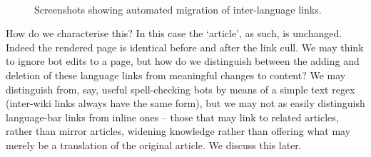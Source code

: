 \begin{figure}
  \label{fig:traj-bot-explanation}
  \centering
  \\
\caption{Screenshots showing automated migration of inter-language links.}
\end{figure}

How do we characterise this? In this case the `article', as such, is
unchanged. Indeed the rendered page is identical before and after the
link cull. We may think to ignore bot edits to a page, but how do we
distinguish between the adding and deletion of these language links
from meaningful changes to content? We may distinguish from, say,
useful spell-checking bots by means of a simple text regex (inter-wiki
links always have the same form), but we may not as easily distinguish
language-bar links from inline ones -- those that may link to related
articles, rather than mirror articles, widening knowledge rather than
offering what may merely be a translation of the original
article. We discuss this later.

